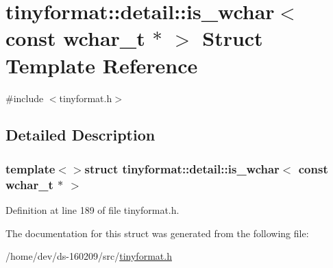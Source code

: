 \hypertarget{structtinyformat_1_1detail_1_1is__wchar_3_01const_01wchar__t_01_5_01_4}{}\section{tinyformat\+:\+:detail\+:\+:is\+\_\+wchar$<$ const wchar\+\_\+t $\ast$ $>$ Struct Template Reference}
\label{structtinyformat_1_1detail_1_1is__wchar_3_01const_01wchar__t_01_5_01_4}


{\ttfamily \#include $<$tinyformat.\+h$>$}



\subsection{Detailed Description}
\subsubsection*{template$<$$>$struct tinyformat\+::detail\+::is\+\_\+wchar$<$ const wchar\+\_\+t $\ast$ $>$}



Definition at line 189 of file tinyformat.\+h.



The documentation for this struct was generated from the following file\+:\begin{DoxyCompactItemize}
\item 
/home/dev/ds-\/160209/src/\hyperlink{tinyformat_8h}{tinyformat.\+h}\end{DoxyCompactItemize}
